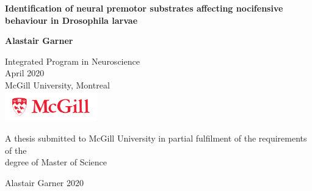 \begin{titlepage}
  \begin{center}
    \vspace*{1cm}

    {\LARGE\textbf{Identification of neural premotor substrates affecting nocifensive behaviour in Drosophila larvae}\par}

    \vspace{2.0cm}
    
    {\Large\textbf{Alastair Garner}\par}

    \vspace{2.0cm}
    
    Integrated Program in Neuroscience\\
    April 2020\\
    McGill University, Montreal\\

    \includegraphics[width=4cm]{./mcgill_sig_red.png}

    \vfill

    {A thesis submitted to McGill University in partial fulfilment of the requirements of the\\
    degree of Master of Science \par}

    \vspace{0.2cm}

    {\textcopyright Alastair Garner 2020 \par}
  \end{center} 
\end{titlepage}
